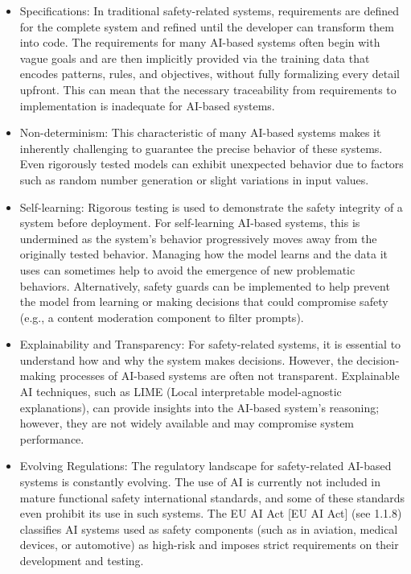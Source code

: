 \documentclass[
  letterpaper,
  DIV=11,
  numbers=noendperiod,
  oneside]{scrreprt}
\begin{document}
\begin{tcolorbox}
\begin{itemize}
\item
  Specifications: In traditional safety-related systems, requirements
  are defined for the complete system and refined until the developer
  can transform them into code. The requirements for many AI-based
  systems often begin with vague goals and are then implicitly provided
  via the training data that encodes patterns, rules, and objectives,
  without fully formalizing every detail upfront. This can mean that the
  necessary traceability from requirements to implementation is
  inadequate for AI-based systems.
\item
  Non-determinism{}: This characteristic of many AI-based systems makes
  it inherently challenging to guarantee the precise behavior of these
  systems. Even rigorously tested models can exhibit unexpected behavior
  due to factors such as random number generation or slight variations
  in input values.
\item
  Self-learning{}: Rigorous testing is used to demonstrate the safety
  integrity of a system before deployment. For self-learning AI-based
  systems, this is undermined as the system's behavior progressively
  moves away from the originally tested behavior. Managing how the model
  learns and the data it uses can sometimes help to avoid the emergence
  of new problematic behaviors. Alternatively, safety guards can be
  implemented to help prevent the model from learning or making
  decisions that could compromise safety (e.g., a content moderation
  component to filter prompts).
\item
  Explainability{} and Transparency{}: For safety-related systems, it is
  essential to understand how and why the system makes decisions.
  However, the decision-making processes of AI-based systems are often
  not transparent. Explainable AI techniques, such as LIME (Local
  interpretable model-agnostic explanations), can provide insights into
  the AI-based system's reasoning; however, they are not widely
  available and may compromise system performance.
\item
  Evolving Regulations: The regulatory landscape for safety-related
  AI-based systems is constantly evolving. The use of AI is currently
  not included in mature functional safety international standards, and
  some of these standards even prohibit its use in such systems. The EU
  AI Act {[}EU AI Act{]} (see 1.1.8) classifies AI systems used as
  safety components (such as in aviation, medical devices, or
  automotive) as high-risk and imposes strict requirements on their
  development and testing.
\end{itemize}


\end{tcolorbox}
\end{document}
